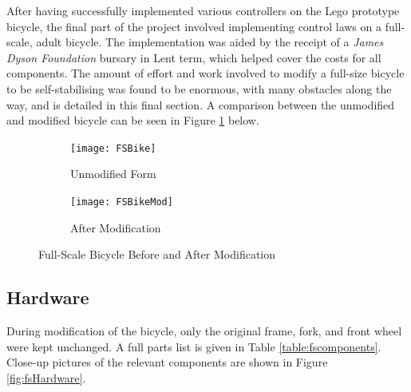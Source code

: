 After having successfully implemented various controllers on the Lego prototype bicycle, the final part of the project involved implementing control laws on a full-scale, adult bicycle. The implementation was aided by the receipt of a \textit{James Dyson Foundation} bursary in Lent term, which helped cover the costs for all components. The amount of effort and work involved to modify a full-size bicycle to be self-stabilising was found to be enormous, with many obstacles along the way, and is detailed in this final section. A comparison between the unmodified and modified bicycle can be seen in Figure \ref{fig:fsvsfsmod} below.

\begin{figure}[H]
	\begin{subfigure}{0.475\textwidth}
	\texttt{[image: FSBike]}
	\caption{Unmodified Form}
	\end{subfigure} \hfill
	\begin{subfigure}{0.475\textwidth}
	\texttt{[image: FSBikeMod]}
	\caption{After Modification}
	\end{subfigure}
	\caption{Full-Scale Bicycle Before and After Modification}
	\label{fig:fsvsfsmod}
\end{figure}

\subsection{Hardware}
During modification of the bicycle, only the original frame, fork, and front wheel were kept unchanged. A full parts list is given in Table \ref{table:fscomponents}. Close-up pictures of the relevant components are shown in Figure \ref{fig:fsHardware}.

